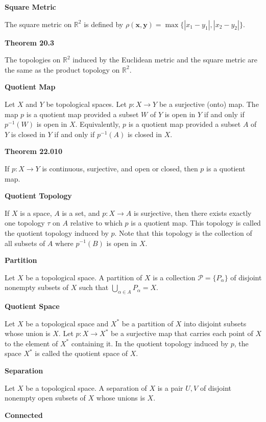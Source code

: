 \documentclass{article}
\newcommand{\inv}{^{-1}}
\newcommand{\R}{\mathbb R}
\begin{document}
\medskip\noindent\textbf{Square Metric}

	The square metric on $\R^2$ is defined by $\rho(\mathbf x,\mathbf y) = \max\{|x_1-y_1|, |x_2-y_2|\}$.

\medskip\noindent\textbf{Theorem 20.3}

	The topologies on $\R^2$ induced by the Euclidean metric and the square metric are the same as the product topology on $\R^2$.

\medskip\noindent\textbf{Quotient Map}

	Let $X$ and $Y$ be topological spaces.
	Let $p: X \to Y$ be a surjective (onto) map.
	The map $p$ is a quotient map provided a subset $W$ of $Y$ is open in $Y$ if and only if $p\inv(W)$ is open in $X$.
	Equivalently, $p$ is a quotient map provided a subset $A$ of $Y$ is closed in $Y$ if and only if $p\inv(A)$ is closed in $X$.

\medskip\noindent\textbf{Theorem 22.010}

	If $p: X \to Y$ is continuous, surjective, and open or closed, then $p$ is a quotient map.

\medskip\noindent\textbf{Quotient Topology}

	If $X$ is a space, $A$ is a set, and $p:X \to A$ is surjective, then there exists exactly one topology $\tau$ on $A$ relative to which $p$ is a quotient map. This topology is called the quotient topology induced by $p$. Note that this topology is the collection of all subsets of $A$ where $p\inv(B)$ is open in $X$.

\medskip\noindent\textbf{Partition}

	Let $X$ be a topological space.
	A partition of $X$ is a collection $\mathcal P=\{P_\alpha\}$ of disjoint nonempty subsets of $X$ such that $\bigcup\limits_{\alpha\in A}P_\alpha = X$.

\medskip\noindent\textbf{Quotient Space}

	Let $X$ be a topological space and $X^*$ be a partition of $X$ into disjoint subsets whose union is $X$. Let $p: X \to X^*$ be a surjective map that carries each point of $X$ to the element of $X^*$ containing it. In the quotient topology induced by $p$, the space $X^*$ is called the quotient space of $X$.

\medskip\noindent\textbf{Separation}

	Let $X$ be a topological space.
	A separation of $X$ is a pair $U,V$ of disjoint nonempty open subsets of $X$ whose unions is $X$.

\medskip\noindent\textbf{Connected}
\end{document}
